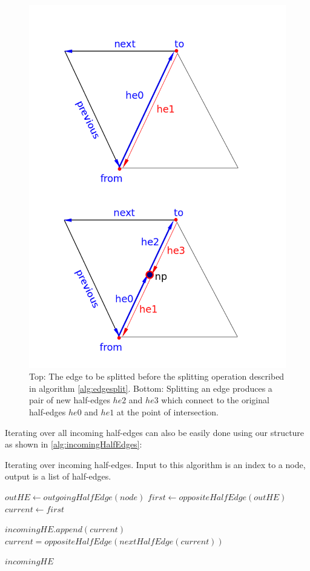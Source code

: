 \begin{figure}[H]
  \centering
  \includegraphics[width=0.8\linewidth]{figures/cutting/splitedge.png}
  \caption{\label{fig:splitedge}
  {Top: The edge to be splitted before the splitting operation described in algorithm \ref{alg:edgesplit}. 
  Bottom: Splitting an edge produces a pair of new half-edges $he2$ and $he3$ which connect to the original half-edges $he0$ and $he1$
  at the point of intersection.}
}
\end{figure}

Iterating over all incoming half-edges can also be easily done using our structure as shown in \ref{alg:incomingHalfEdges}:

\begin{algorithm}[H]
\caption{Iterating over incoming half-edges. Input to this algorithm is an index to a node, output is a list
of half-edges.}
\label{alg:incomingHalfEdges}
\begin{algorithmic}[1]	
  \STATE $outHE \gets outgoingHalfEdge(node)$
  \STATE $first \gets oppositeHalfEdge(outHE)$
  \STATE $current \gets first$
  
  \REPEAT
    \STATE $incomingHE.append(current)$
    \STATE $current = oppositeHalfEdge(nextHalfEdge(current))$
  
  \RETURN $incomingHE$
\end{algorithmic}
\end{algorithm}

